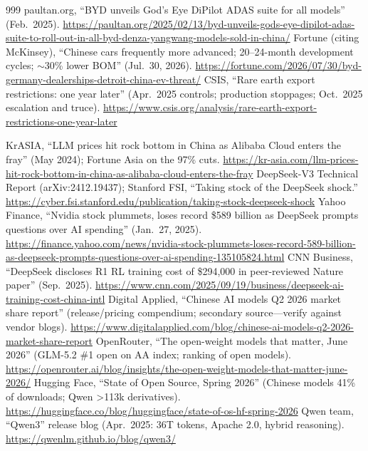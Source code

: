 \begin{thebibliography}{999}
 paultan.org, ``BYD unveils God's Eye DiPilot ADAS suite for all models'' (Feb.\ 2025). \url{https://paultan.org/2025/02/13/byd-unveils-gods-eye-dipilot-adas-suite-to-roll-out-in-all-byd-denza-yangwang-models-sold-in-china/}
 Fortune (citing McKinsey), ``Chinese cars frequently more advanced; 20--24-month development cycles; $\sim$30\% lower BOM'' (Jul.\ 30, 2026). \url{https://fortune.com/2026/07/30/byd-germany-dealerships-detroit-china-ev-threat/}
 CSIS, ``Rare earth export restrictions: one year later'' (Apr.\ 2025 controls; production stoppages; Oct.\ 2025 escalation and truce). \url{https://www.csis.org/analysis/rare-earth-export-restrictions-one-year-later}

 KrASIA, ``LLM prices hit rock bottom in China as Alibaba Cloud enters the fray'' (May 2024); Fortune Asia on the 97\% cuts. \url{https://kr-asia.com/llm-prices-hit-rock-bottom-in-china-as-alibaba-cloud-enters-the-fray}
 DeepSeek-V3 Technical Report (arXiv:2412.19437); Stanford FSI, ``Taking stock of the DeepSeek shock.'' \url{https://cyber.fsi.stanford.edu/publication/taking-stock-deepseek-shock}
 Yahoo Finance, ``Nvidia stock plummets, loses record \$589 billion as DeepSeek prompts questions over AI spending'' (Jan.\ 27, 2025). \url{https://finance.yahoo.com/news/nvidia-stock-plummets-loses-record-589-billion-as-deepseek-prompts-questions-over-ai-spending-135105824.html}
 CNN Business, ``DeepSeek discloses R1 RL training cost of \$294,000 in peer-reviewed Nature paper'' (Sep.\ 2025). \url{https://www.cnn.com/2025/09/19/business/deepseek-ai-training-cost-china-intl}
 Digital Applied, ``Chinese AI models Q2 2026 market share report'' (release/pricing compendium; secondary source---verify against vendor blogs). \url{https://www.digitalapplied.com/blog/chinese-ai-models-q2-2026-market-share-report}
 OpenRouter, ``The open-weight models that matter, June 2026'' (GLM-5.2 \#1 open on AA index; ranking of open models). \url{https://openrouter.ai/blog/insights/the-open-weight-models-that-matter-june-2026/}
 Hugging Face, ``State of Open Source, Spring 2026'' (Chinese models 41\% of downloads; Qwen \textgreater113k derivatives). \url{https://huggingface.co/blog/huggingface/state-of-os-hf-spring-2026}
 Qwen team, ``Qwen3'' release blog (Apr.\ 2025: 36T tokens, Apache 2.0, hybrid reasoning). \url{https://qwenlm.github.io/blog/qwen3/}

\end{thebibliography}
